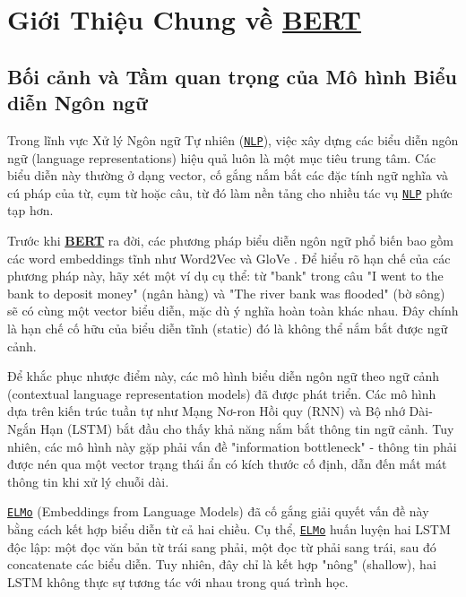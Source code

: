 \section{Giới Thiệu Chung về \hyperref[acro:bert]{\textbf{BERT}}}
\label{sec:gioi_thieu_chung_bert}

\subsection{Bối cảnh và Tầm quan trọng của Mô hình Biểu diễn Ngôn ngữ}
\label{ssec:boi_canh_bieu_dien_ngon_ngu}
Trong lĩnh vực Xử lý Ngôn ngữ Tự nhiên (\hyperref[acro:nlp]{\texttt{NLP}}), việc xây dựng các biểu diễn ngôn ngữ (language representations) hiệu quả luôn là một mục tiêu trung tâm. Các biểu diễn này thường ở dạng vector, cố gắng nắm bắt các đặc tính ngữ nghĩa và cú pháp của từ, cụm từ hoặc câu, từ đó làm nền tảng cho nhiều tác vụ \hyperref[acro:nlp]{\texttt{NLP}} phức tạp hơn.

Trước khi \hyperref[acro:bert]{\textbf{BERT}} ra đời, các phương pháp biểu diễn ngôn ngữ phổ biến bao gồm các word embeddings tĩnh như Word2Vec \cite{mikolov2013distributed} và GloVe \cite{pennington2014glove}.
Để hiểu rõ hạn chế của các phương pháp này, hãy xét một ví dụ cụ thể: từ "bank" trong câu "I went to the bank to deposit money" (ngân hàng) và "The river bank was flooded" (bờ sông) sẽ có cùng một vector biểu diễn, mặc dù ý nghĩa hoàn toàn khác nhau.
Đây chính là hạn chế cố hữu của biểu diễn tĩnh (static) đó là không thể nắm bắt được ngữ cảnh.

Để khắc phục nhược điểm này, các mô hình biểu diễn ngôn ngữ theo ngữ cảnh (contextual language representation models) đã được phát triển.
Các mô hình dựa trên kiến trúc tuần tự như Mạng Nơ-ron Hồi quy (RNN) và Bộ nhớ Dài-Ngắn Hạn (LSTM) bắt đầu cho thấy khả năng nắm bắt thông tin ngữ cảnh.
Tuy nhiên, các mô hình này gặp phải vấn đề "information bottleneck" - thông tin phải được nén qua một vector trạng thái ẩn có kích thước cố định, dẫn đến mất mát thông tin khi xử lý chuỗi dài.

\hyperref[acro:elmo]{\texttt{ELMo}} (Embeddings from Language Models) \cite{peters2018deep} đã cố gắng giải quyết vấn đề này bằng cách kết hợp biểu diễn từ cả hai chiều.
Cụ thể, \hyperref[acro:elmo]{\texttt{ELMo}} huấn luyện hai LSTM độc lập: một đọc văn bản từ trái sang phải, một đọc từ phải sang trái, sau đó concatenate các biểu diễn.
Tuy nhiên, đây chỉ là kết hợp "nông" (shallow), hai LSTM không thực sự tương tác với nhau trong quá trình học.

